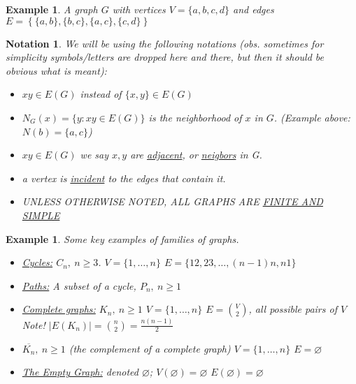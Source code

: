 \documentclass[a4paper]{article}
\theoremstyle{plain}
\newtheorem{notation}[lemma]{Notation}
\theoremstyle{myremark}
\newtheorem{example}[lemma]{Example}
\begin{document}
\begin{example}
A graph $G$ with vertices $V=\{a,b,c,d\}$ and edges $E=\left\{\{a,b\},\{b,c\},\{a,c\},\{c,d\}\right\}$
\end{example}

\newpage
\begin{notation}
We will be using the following notations (obs. sometimes for simplicity symbols/letters are dropped here and there, but then it should be obvious what is meant):
\begin{itemize}
    \item $xy\in E(G)$ instead of $\{x,y\}\in E(G)$
    \item $N_G(x)=\{y: xy\in E(G)\}$ is the neighborhood of $x$ in $G$. (Example above: $N(b)=\{a,c\}$)
    \item $xy\in E(G)$ we say $x,y$ are \underline{adjacent}, or \underline{neigbors} in G.
    \item a vertex is \underline{incident} to the edges that contain it.
    \item UNLESS OTHERWISE NOTED, ALL GRAPHS ARE \underline{FINITE AND SIMPLE}
\end{itemize}
\end{notation}

\begin{example}
Some key examples of families of graphs.
\begin{itemize}
    \item \underline{Cycles:} $C_n,\ n\geq 3$.\newline
    $V=\{1,\dots,n\}$\newline
    $E=\{12,23,\dots,(n-1)n,n1\}$
    \item \underline{Paths:} A subset of a cycle, $P_n,\ n\geq 1$
    \item \underline{Complete graphs:} $K_n,\ n\geq 1$\newline 
    $V=\{1,\dots,n\}$\newline
    $E={V \choose 2}$, all possible pairs of $V$\newline
    Note! $|E(K_n)|={n \choose 2}=\frac{n(n-1)}{2}$
    \item $\overline{K_n},\ n\geq 1$ (the complement of a complete graph)\newline 
    $V=\{1,\dots,n\}$\newline
    $E=\varnothing$
    \item \underline{The Empty Graph:} denoted $\varnothing$;\newline 
    $V(\varnothing)=\varnothing$\newline
    $E(\varnothing)=\varnothing$
\end{itemize}
\end{example}
\end{document}
